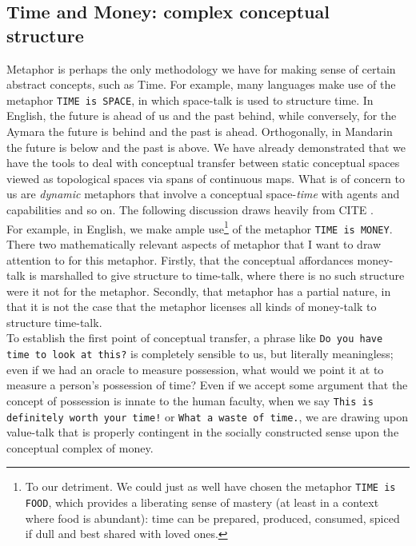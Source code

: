 \subsection{Time and Money: complex conceptual structure}

Metaphor is perhaps the only methodology we have for making sense of certain abstract concepts, such as Time. For example, many languages make use of the metaphor \texttt{TIME is SPACE}, in which space-talk is used to structure time. In English, the future is ahead of us and the past behind, while conversely, for the Aymara the future is behind and the past is ahead. Orthogonally, in Mandarin the future is below and the past is above. We have already demonstrated that we have the tools to deal with conceptual transfer between static conceptual spaces viewed as topological spaces via spans of continuous maps. What is of concern to us are \emph{dynamic} metaphors that involve a conceptual space-\emph{time} with agents and capabilities and so on. The following discussion draws heavily from \bR CITE \e.\\

For example, in English, we make ample use\footnote{To our detriment. We could just as well have chosen the metaphor \texttt{TIME is FOOD}, which provides a liberating sense of mastery (at least in a context where food is abundant): time can be prepared, produced, consumed, spiced if dull and best shared with loved ones.} of the metaphor \texttt{TIME is MONEY}. There two mathematically relevant aspects of metaphor that I want to draw attention to for this metaphor. Firstly, that the conceptual affordances money-talk is marshalled to give structure to time-talk, where there is no such structure were it not for the metaphor. Secondly, that metaphor has a partial nature, in that it is not the case that the metaphor licenses all kinds of money-talk to structure time-talk.\\

To establish the first point of conceptual transfer, a phrase like \texttt{Do you have time to look at this?} is completely sensible to us, but literally meaningless; even if we had an oracle to measure possession, what would we point it at to measure a person's possession of time? Even if we accept some argument that the concept of possession is innate to the human faculty, when we say \texttt{This is definitely worth your time!} or \texttt{What a waste of time.}, we are drawing upon value-talk that is properly contingent in the socially constructed sense upon the conceptual complex of money.\\

